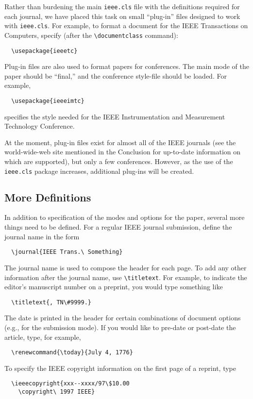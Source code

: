\documentclass[%
	final,
	notitlepage,
	narroweqnarray,
	inline,
	twoside,
	]{ieee}
\begin{document}
Rather than burdening the main \texttt{ieee.cls} file with the
definitions required for each journal, we have placed this task on
small ``plug-in'' files designed to work with \texttt{ieee.cls}. For
example, to format a document for the IEEE Transactions on Computers,
specify (after the \verb|\documentclass| command):
\begin{verbatim}
  \usepackage{ieeetc}
\end{verbatim}
Plug-in files are also used to format papers for conferences. The 
main mode of the paper should be ``final,'' and the 
conference style-file should be loaded. For example,
\begin{verbatim}
  \usepackage{ieeeimtc}
\end{verbatim}
specifies the style needed for the IEEE Instrumentation and
Measurement Technology Conference.

At the moment, plug-in files exist for almost all of the IEEE journals
(see the world-wide-web site mentioned in the Conclusion for
up-to-date information on which are supported), but only a few
conferences.  However, as the use of the \texttt{ieee.cls} package
increases, additional plug-ins will be created.

\subsection{More Definitions}

In addition to specification of the modes and options for the paper,
several more things need to be defined. For a regular IEEE journal
submission, define the journal name in the form
\begin{verbatim}
  \journal{IEEE Trans.\ Something}
\end{verbatim}
The journal name is used to compose the header for each page.  To add
any other information after the journal name, use \verb|\titletext|.
For example, to indicate the editor's manuscript number on a preprint,
you would type something like
\begin{verbatim}
  \titletext{, TN\#9999.}
\end{verbatim}

The date is printed in the header for certain combinations of document
options (e.g., for the submission mode). If you would like to pre-date
or post-date the article, type, for example,
\begin{verbatim}
  \renewcommand{\today}{July 4, 1776}
\end{verbatim}
To specify the IEEE copyright information on the first page of a
reprint, type
\begin{verbatim}
  \ieeecopyright{xxx--xxxx/97\$10.00 
    \copyright\ 1997 IEEE}
\end{verbatim}
\end{document}
